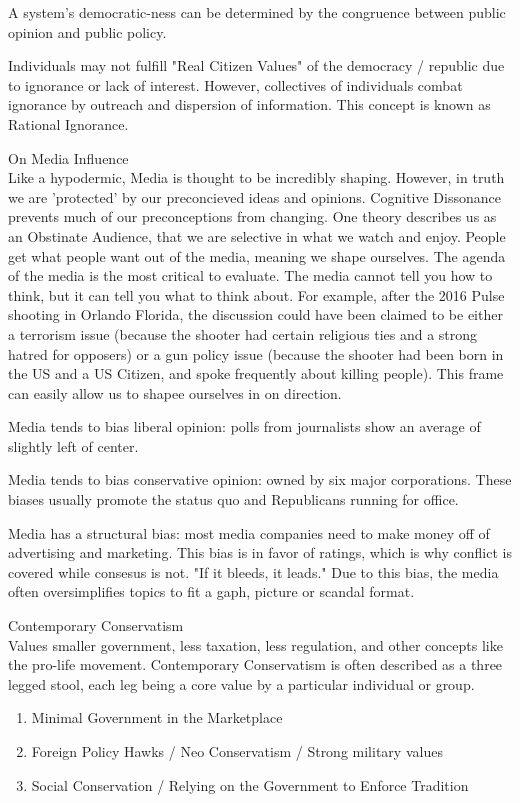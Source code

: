 \documentclass{article}
\begin{document}
A system's democratic-ness can be determined by the congruence between public opinion and public policy.

Individuals may not fulfill "Real Citizen Values" of the democracy / republic due to ignorance or lack of interest. However, collectives of individuals combat ignorance by outreach and dispersion of information. This concept is known as Rational Ignorance.

\noindent
\Large
On Media Influence\\
\normalsize
Like a hypodermic, Media is thought to be incredibly shaping. However, in truth we are 'protected' by our preconcieved ideas and opinions. Cognitive Dissonance prevents much of our preconceptions from changing. One theory describes us as an Obstinate Audience, that we are selective in what we watch and enjoy. People get what people want out of the media, meaning we shape ourselves. The agenda of the media is the most critical to evaluate. The media cannot tell you how to think, but it can tell you what to think about. For example, after the 2016 Pulse shooting in Orlando Florida, the discussion could have been claimed to be either a terrorism issue (because the shooter had certain religious ties and a strong hatred for opposers) or a gun policy issue (because the shooter had been born in the US and a US Citizen, and spoke frequently about killing people). This frame can easily allow us to shapee ourselves in on direction.

Media tends to bias liberal opinion: polls from journalists show an average of slightly left of center.

Media tends to bias conservative opinion: owned by six major corporations. These biases usually promote the status quo and Republicans running for office.

Media has a structural bias: most media companies need to make money off of advertising and marketing. This bias is in favor of ratings, which is why conflict is covered while consesus is not. "If it bleeds, it leads." Due to this bias, the media often oversimplifies topics to fit a gaph, picture or scandal format.

\noindent
\Large
Contemporary Conservatism\\
\normalsize
\indent
Values smaller government, less taxation, less regulation, and other concepts like the pro-life movement. Contemporary Conservatism is often described as a three legged stool, each leg being a core value by a particular individual or group.
\begin{enumerate}
  \item Minimal Government in the Marketplace
  \item Foreign Policy Hawks / Neo Conservatism / Strong military values
  \item Social Conservation / Relying on the Government to Enforce Tradition
\end{enumerate}
\end{document}
